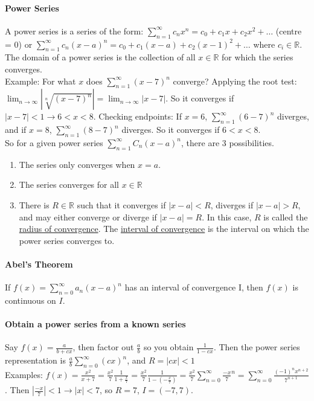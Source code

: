 \documentclass[10pt,letter]{article}
\begin{document}
\paragraph{Power Series} A power series is a series of the form: $\sum_{n=1}^\infty c_nx^n=c_0+c_1x+c_2x^2+\ldots$ (centre = 0) or $\sum_{n=1}^\infty c_n(x-a)^n = c_0+c_1(x-a)+c_2(x-1)^2+\ldots$ where $c_i\in\mathbb{R}$. The domain of a power series is the collection of all $x\in\mathbb{R}$ for which the series converges. \\ 
Example: For what $x$ does $\sum_{n=1}^\infty (x-7)^n$ converge? Applying the root test: $\lim_{n\rightarrow\infty}|\sqrt[n]{(x-7)^n}| = \lim_{n\rightarrow\infty}|x-7|$. So it converges if $|x-7|<1\rightarrow 6<x<8$. Checking endpoints: If $x=6$, $\sum_{n=1}^\infty (6-7)^n$ diverges, and if $x=8$, $\sum_{n=1}^\infty (8-7)^n$ diverges. So it converges if $6<x<8$. \\ 
So for a given power series $\sum_{n=1}^\infty C_n(x-a)^n$, there are 3 possibilities.\begin{enumerate}
    \item The series only converges when $x=a$.
    \item The series converges for all $x\in\mathbb{R}$ 
    \item There is $R\in\mathbb{R}$ such that it converges if $|x-a|<R$, diverges if $|x-a|>R$, and may either converge or diverge if $|x-a|=R$. In this case, $R$ is called the \underline{radius of convergence}. The \underline{interval of convergence} is the interval on which the power series converges to. 
\end{enumerate}

\paragraph{Abel's Theorem} If $f(x)=\sum_{n=0}^\infty a_n(x-a)^n$ has an interval of convergence I, then $f(x)$ is continuous on $I$. 

\paragraph{Obtain a power series from a known series} Say $f(x)=\frac{a}{b+cx}$, then factor out $\frac{a}{b}$ so you obtain $\frac{1}{1-cx}$. Then the power series representation is $\frac{a}{b}\sum_{n=0}^\infty (cx)^n$, and $R = |cx|<1$ \\ 
Examples: $f(x)=\frac{x^2}{x+7}=\frac{x^2}{7}\frac{1}{1+\frac{x}{7}}=\frac{x^2}{7}\frac{1}{1-\left(-\frac{x}{7}\right)}=\frac{x^2}{7}\sum_{n=0}^\infty \frac{-x}{7}^n = \sum_{n=0}^\infty\frac{(-1)^nx^{n+2}}{7^{n+1}}$. Then $|\frac{-x}{7}|<1\rightarrow |x|<7$, so $R=7$, $I=(-7,7)$.  
\end{document}
